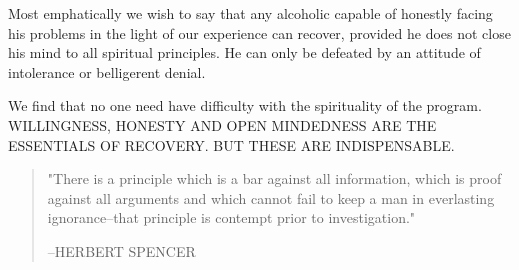 \begin{biblechapter}
    Most emphatically we wish to say that 
    any alcoholic capable of honestly facing his problems 
    in the light of our experience 
    can recover, 
    provided he does not close his mind to all spiritual principles.
\verse He can only be defeated by an attitude of intolerance 
    or belligerent denial.

    We find that no one need have difficulty with 
    the spirituality of the program.
\verse WILLINGNESS, HONESTY AND OPEN MINDEDNESS ARE THE ESSENTIALS OF RECOVERY.
\verse BUT THESE ARE INDISPENSABLE.

\begin{quote}
\verse "There is a principle which is a bar against all information, 
    which is proof against all arguments 
    and which cannot fail to keep a man in everlasting ignorance--that 
    principle is contempt prior to investigation."

    \hfill{--HERBERT SPENCER}
\end{quote}
\end{biblechapter}
